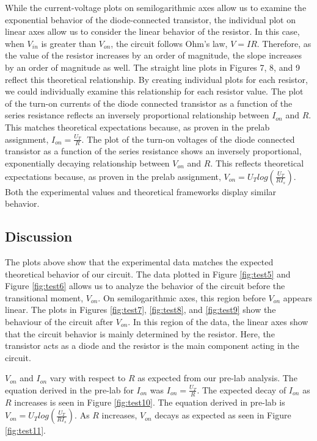 \documentclass{article}
\begin{document}
While the current-voltage plots on semilogarithmic axes allow us to examine the exponential behavior of the diode-connected transistor, the individual plot on linear axes allow us to consider the linear behavior of the resistor. In this case, when $V_{in}$ is greater than $V_{on}$, the circuit follows Ohm's law, $V=IR$. Therefore, as the value of the resistor increases by an order of magnitude, the slope increases by an order of magnitude as well. The straight line plots in Figures 7, 8, and 9 reflect this theoretical relationship. By creating individual plots for each resistor, we could individually examine this relationship for each resistor value.
\newline
\newline
The plot of the turn-on currents of the diode connected transistor as a function of the series resistance reflects an inversely proportional relationship between $I_{on}$ and $R$. This matches theoretical expectations because, as proven in the prelab assignment, $I_{on} = \frac{U_T}{R}$. 
\newline
\newline
The plot of the turn-on voltages of the diode connected transistor as a function of the series resistance shows an inversely proportional, exponentially decaying relationship between $V_{on}$ and $R$. This reflects theoretical expectations because, as proven in the prelab assignment, $V_{on} = U_{T}log(\frac{U_{T}}{RI_{s}})$. Both the experimental values and theoretical frameworks display similar behavior.
\subsection{Discussion}
The plots above show that the experimental data matches the expected theoretical behavior of our circuit. The data plotted in Figure \ref{fig:test5} and Figure \ref{fig:test6} allows us to analyze the behavior of the circuit before the transitional moment, $V_{on}$. On semilogarithmic axes, this region before $V_{on}$ appears linear.
The plots in Figures \ref{fig:test7}, \ref{fig:test8}, and \ref{fig:test9} show the behaviour of the circuit after $V_{on}$. In this region of the data, the linear axes show that the circuit behavior is mainly determined by the resistor. Here, the transistor acts as a diode and the resistor is the main component acting in the circuit.

$V_{on}$ and $I_{on}$ vary with respect to $R$ as expected from our pre-lab analysis.  The equation derived in the pre-lab for  $I_{on}$ was $I_{on} =\frac{U_{T}}{R}$.  The expected decay of $I_{on}$ as $R$ increases is seen in Figure \ref{fig:test10}.  The equation derived in pre-lab is  $V_{on} = U_{T}log(\frac{U_{T}}{RI_{s}})$.  As $R$ increases, $V_{on}$ decays as expected as seen in Figure \ref{fig:test11}.
\end{document}
